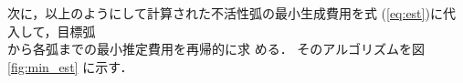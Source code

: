 次に，\hspace*{0.3mm}以\hspace*{0.1mm}上\hspace*{0.1mm}の\hspace*{0.1mm}よ\hspace*{0.1mm}う\hspace*{0.1mm}に\hspace*{0.1mm}し\hspace*{0.1mm}て計\hspace*{0.1mm}算\hspace*{0.1mm}された\hspace*{0.1mm}不\hspace*{0.2mm}活\hspace*{0.2mm}性\hspace*{0.2mm}弧の最\hspace*{0.1mm}小\hspace*{0.1mm}生\hspace*{0.2mm}成\hspace*{0.2mm}費\hspace*{0.2mm}用\hspace*{0.1mm}を式
(\ref{eq:est})に代入して，\hspace*{0.3mm}目\hspace*{0.1mm}標\hspace*{0.1mm}弧\\から各弧までの最小推定費用を再帰的に求
める．
そのアルゴリズムを図\ref{fig:min_est} に示す．
